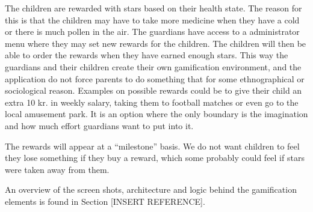 The children are rewarded with stars based on their health state. The reason for this is that the children may have to take more medicine when they have a cold or there is much pollen in the air. The guardians have access to a administrator menu where they may set new rewards for the children. The children will then be able to order the rewards when they have earned enough stars. This way the guardians and their children create their own gamification environment, and the application do not force parents to do something that for some ethnographical or sociological reason. Examples on possible rewards could be to give their child an extra 10 kr. in weekly salary, taking them to football matches or even go to the local amusement park. It is an option where the only boundary is the imagination and how much effort guardians want to put into it.    


The rewards will appear at a ``milestone'' basis. We do not want children to feel they lose something if they buy a reward, which some probably could feel if stars were taken away from them.


An overview of the screen shots, architecture and logic behind the gamification elements is found in Section [INSERT REFERENCE].


